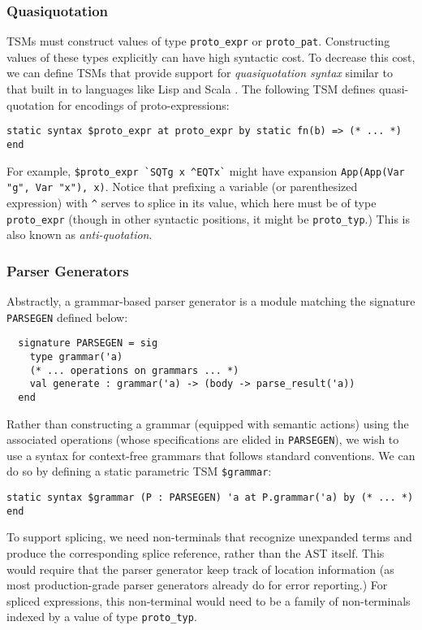\documentclass[acmlarge,review,anonymous]{acmart}\settopmatter{printfolios=true}
\newcommand{\li}[1]{\lstinline{#1}}
\begin{document}
\subsubsection{Quasiquotation}
TSMs must construct values of type \li{proto_expr} or \li{proto_pat}. Constructing values of these types explicitly can have high syntactic cost. To decrease this cost, we can define TSMs that provide support for \emph{quasiquotation syntax} similar to that built in to languages like Lisp \cite{Bawd99a} and Scala \cite{shabalin2013quasiquotes}. The following TSM defines quasi-quotation for encodings of proto-expressions:
\begin{lstlisting}[numbers=none]
  static syntax $proto_expr at proto_expr by static fn(b) => (* ... *) end
\end{lstlisting}
For example, \li{$proto_expr `SQTg x ^EQTx`} might have expansion \li{App(App(Var "g", Var "x"), x)}. Notice that prefixing a variable (or parenthesized expression) with \li{^} serves to splice in its value, which here must be of type \li{proto_expr} (though in other syntactic positions, it might be \li{proto_typ}.) This is also known as \emph{anti-quotation}.


\subsubsection{Parser Generators}
Abstractly, a grammar-based parser generator is a module matching the signature \li{PARSEGEN} defined below:
\begin{lstlisting}
  signature PARSEGEN = sig 
    type grammar('a)
    (* ... operations on grammars ... *)
    val generate : grammar('a) -> (body -> parse_result('a))
  end
\end{lstlisting}

Rather than constructing a grammar (equipped with semantic actions) using the associated operations (whose specifications are elided in \li{PARSEGEN}), we wish to use a syntax for context-free grammars that follows standard conventions. We can do so by defining a static parametric TSM \li{$grammar}:
\begin{lstlisting}[numbers=none]
  static syntax $grammar (P : PARSEGEN) 'a at P.grammar('a) by (* ... *) end
\end{lstlisting}
To support splicing, we need non-terminals that recognize unexpanded terms and produce the corresponding splice reference, rather than the AST itself. This would require that the parser generator keep track of location information (as most production-grade parser generators already do for error reporting.) For spliced expressions, this non-terminal would need to be a family of non-terminals indexed by a value of type \li{proto_typ}. 
\end{document}
